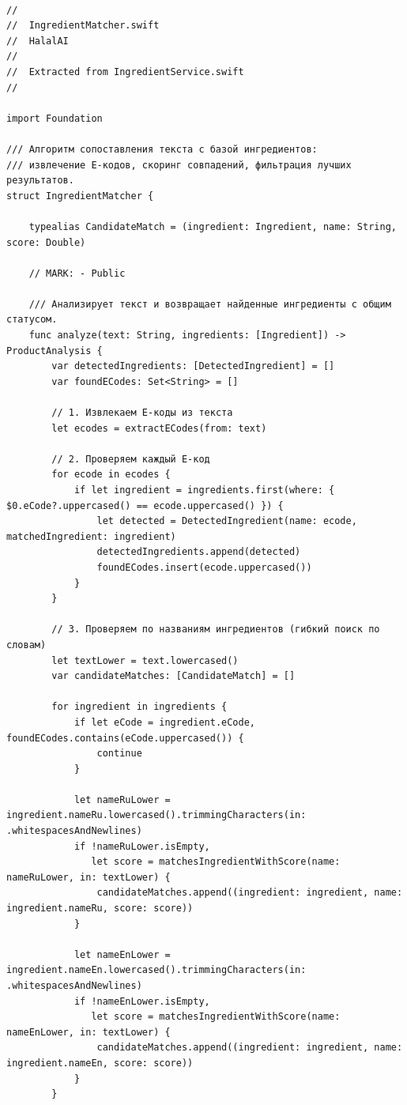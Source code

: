 \begin{lstlisting}[basicstyle=\tiny\ttfamily,breaklines=true]

//
//  IngredientMatcher.swift
//  HalalAI
//
//  Extracted from IngredientService.swift
//

import Foundation

/// Алгоритм сопоставления текста с базой ингредиентов:
/// извлечение E-кодов, скоринг совпадений, фильтрация лучших результатов.
struct IngredientMatcher {

    typealias CandidateMatch = (ingredient: Ingredient, name: String, score: Double)

    // MARK: - Public

    /// Анализирует текст и возвращает найденные ингредиенты с общим статусом.
    func analyze(text: String, ingredients: [Ingredient]) -> ProductAnalysis {
        var detectedIngredients: [DetectedIngredient] = []
        var foundECodes: Set<String> = []

        // 1. Извлекаем E-коды из текста
        let ecodes = extractECodes(from: text)

        // 2. Проверяем каждый E-код
        for ecode in ecodes {
            if let ingredient = ingredients.first(where: { $0.eCode?.uppercased() == ecode.uppercased() }) {
                let detected = DetectedIngredient(name: ecode, matchedIngredient: ingredient)
                detectedIngredients.append(detected)
                foundECodes.insert(ecode.uppercased())
            }
        }

        // 3. Проверяем по названиям ингредиентов (гибкий поиск по словам)
        let textLower = text.lowercased()
        var candidateMatches: [CandidateMatch] = []

        for ingredient in ingredients {
            if let eCode = ingredient.eCode, foundECodes.contains(eCode.uppercased()) {
                continue
            }

            let nameRuLower = ingredient.nameRu.lowercased().trimmingCharacters(in: .whitespacesAndNewlines)
            if !nameRuLower.isEmpty,
               let score = matchesIngredientWithScore(name: nameRuLower, in: textLower) {
                candidateMatches.append((ingredient: ingredient, name: ingredient.nameRu, score: score))
            }

            let nameEnLower = ingredient.nameEn.lowercased().trimmingCharacters(in: .whitespacesAndNewlines)
            if !nameEnLower.isEmpty,
               let score = matchesIngredientWithScore(name: nameEnLower, in: textLower) {
                candidateMatches.append((ingredient: ingredient, name: ingredient.nameEn, score: score))
            }
        }


\end{lstlisting}
